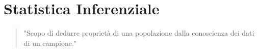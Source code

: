 \section{Statistica Inferenziale}

\begin{quotation}
	"Scopo di dedurre proprietà di una popolazione dalla conoscienza dei dati di un campione."
\end{quotation}